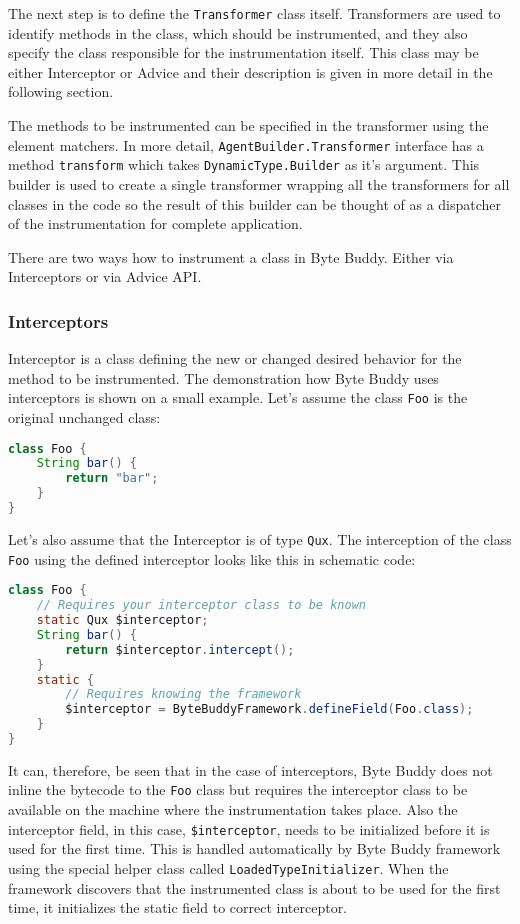 The next step is to define the \texttt{Transformer} class itself. Transformers are used to identify methods in the class, which should be instrumented, and they also specify the class responsible for the instrumentation itself. This class may be either Interceptor or Advice and their description is given in more detail in the following section. 

The methods to be instrumented can be specified in the transformer using the element matchers. In more detail, \texttt{AgentBuilder.Transformer} interface has a method \texttt{transform} which takes \texttt{DynamicType.Builder} as it's argument. This builder is used to create a single transformer wrapping all the transformers for all classes in the code so the result of this builder can be thought of as a dispatcher of the instrumentation for complete application.

There are two ways how to instrument a class in Byte Buddy. Either via Interceptors or via Advice API.
\subsubsection{Interceptors}
Interceptor is a class defining the new or changed desired behavior for the method to be instrumented.  The demonstration how Byte Buddy uses interceptors is shown on a small example. Let's assume the class \texttt{Foo} is the original unchanged class:
\begin{lstlisting}[language=Java]
class Foo {
	String bar() {
		return "bar"; 
	}
}
\end{lstlisting}
	
Let's also assume that the Interceptor is of type \texttt{Qux}. The interception of the class \texttt{Foo} using the defined interceptor looks like this in schematic code:

\begin{lstlisting}[language=Java]
class Foo {
	// Requires your interceptor class to be known
	static Qux $interceptor;
	String bar() {
		return $interceptor.intercept(); 
	}
	static {
		// Requires knowing the framework
		$interceptor = ByteBuddyFramework.defineField(Foo.class);
	}
}
\end{lstlisting}
		
It can, therefore, be seen that in the case of interceptors, Byte Buddy does not inline the bytecode to the \texttt{Foo} class but requires the interceptor class to be available on the machine where the instrumentation takes place. Also the interceptor field, in this case, \texttt{\$interceptor}, needs to be initialized before it is used for the first time. This is handled automatically by Byte Buddy framework using the special helper class called \texttt{LoadedTypeInitializer}. When the framework discovers that the instrumented class is about to be used for the first time, it initializes the static field to correct interceptor.

